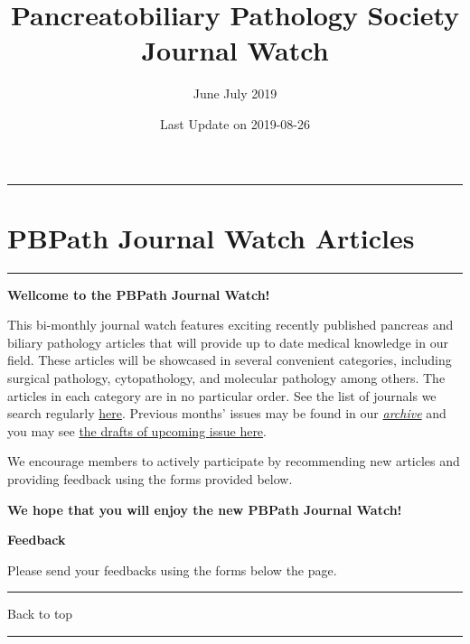 \documentclass[]{article}
\title{Pancreatobiliary Pathology Society Journal Watch}
\subtitle{June July 2019}
\author{}
\date{Last Update on 2019-08-26}
\begin{document}
\maketitle

{
\setcounter{tocdepth}{5}
\tableofcontents
}
\begin{center}\rule{0.5\linewidth}{\linethickness}\end{center}

\hypertarget{pbpath-journal-watch-articles}{%
\section{PBPath Journal Watch
Articles}\label{pbpath-journal-watch-articles}}

\begin{center}\rule{0.5\linewidth}{\linethickness}\end{center}

\textbf{Wellcome to the PBPath Journal Watch!}

This bi-monthly journal watch features exciting recently published
pancreas and biliary pathology articles that will provide up to date
medical knowledge in our field. These articles will be showcased in
several convenient categories, including surgical pathology,
cytopathology, and molecular pathology among others. The articles in
each category are in no particular order. See the list of journals we
search regularly \href{http://pbpath.org/pbpath-journal-watch/}{here}.
Previous months' issues may be found in our
\emph{\href{http://pbpath.org/journal-watch-archive/}{archive}} and you
may see \href{http://pbpath.org/journal-watch-upcoming-issue/}{the
drafts of upcoming issue here}.

We encourage members to actively participate by recommending new
articles and providing feedback using the forms provided below.

\textbf{We hope that you will enjoy the new PBPath Journal Watch!}

\textbf{Feedback}

Please send your feedbacks using the forms below the page.

\begin{center}\rule{0.5\linewidth}{\linethickness}\end{center}

Back to top

\begin{center}\rule{0.5\linewidth}{\linethickness}\end{center}
\end{document}
